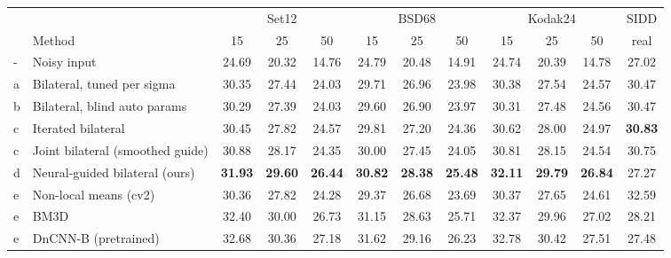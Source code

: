 \begin{tabular}{llcccccccccc}
\toprule
 & & \multicolumn{3}{c}{Set12} & \multicolumn{3}{c}{BSD68} & \multicolumn{3}{c}{Kodak24} & SIDD \\
\cmidrule(lr){3-5}\cmidrule(lr){6-8}\cmidrule(lr){9-11}\cmidrule(lr){12-12}
 & Method & 15 & 25 & 50 & 15 & 25 & 50 & 15 & 25 & 50 & real \\
\midrule
- & Noisy input & 24.69 & 20.32 & 14.76 & 24.79 & 20.48 & 14.91 & 24.74 & 20.39 & 14.78 & 27.02 \\
a & Bilateral, tuned per sigma & 30.35 & 27.44 & 24.03 & 29.71 & 26.96 & 23.98 & 30.38 & 27.54 & 24.57 & 30.47 \\
b & Bilateral, blind auto params & 30.29 & 27.39 & 24.03 & 29.60 & 26.90 & 23.97 & 30.31 & 27.48 & 24.56 & 30.47 \\
c & Iterated bilateral & 30.45 & 27.82 & 24.57 & 29.81 & 27.20 & 24.36 & 30.62 & 28.00 & 24.97 & \textbf{30.83} \\
c & Joint bilateral (smoothed guide) & 30.88 & 28.17 & 24.35 & 30.00 & 27.45 & 24.05 & 30.81 & 28.15 & 24.54 & 30.75 \\
d & Neural-guided bilateral (ours) & \textbf{31.93} & \textbf{29.60} & \textbf{26.44} & \textbf{30.82} & \textbf{28.38} & \textbf{25.48} & \textbf{32.11} & \textbf{29.79} & \textbf{26.84} & 27.27 \\
\midrule
e & Non-local means (cv2) & 30.36 & 27.82 & 24.28 & 29.37 & 26.68 & 23.69 & 30.37 & 27.65 & 24.61 & 32.59 \\
e & BM3D & 32.40 & 30.00 & 26.73 & 31.15 & 28.63 & 25.71 & 32.37 & 29.96 & 27.02 & 28.21 \\
e & DnCNN-B (pretrained) & 32.68 & 30.36 & 27.18 & 31.62 & 29.16 & 26.23 & 32.78 & 30.42 & 27.51 & 27.48 \\
\bottomrule
\end{tabular}
